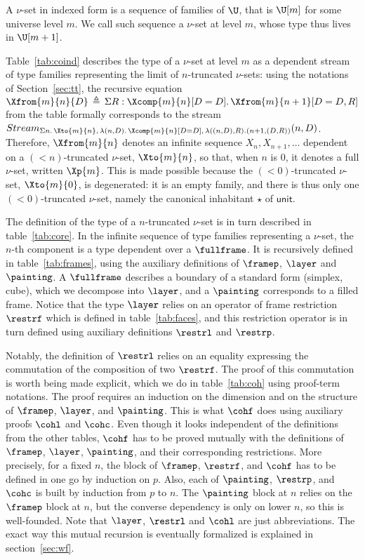 \documentclass{msc}
\newcommand{\unittype}{\ensuremath{\mathsf{unit}}}
\newcommand{\defeq}{\ensuremath{\triangleq}}
\renewcommand{\D}{D}
\newcommand{\pair}[2]{#1, #2}
\newcommand{\kstar}{{\star}}
\begin{document}
A $\nu$-set in indexed form is a sequence of families of $\U$, that is $\U[m]$ for some universe level $m$. We call such sequence a $\nu$-set at level $m$, whose type thus lives in $\U[m+1]$.

Table~\ref{tab:coind} describes the type of a $\nu$-set at level $m$ as a dependent stream of type families representing the limit of $n$-truncated $\nu$-sets: using the notations of Section~\ref{sec:tt}, the recursive equation $\Xfrom{m}{n}{D} \,\defeq\, \Sigma R: \Xcomp{m}{n}[D=\D].\, \Xfrom{m}{n+1}[D=\pair{D}{R}]$ from the table formally corresponds to the stream $Stream_{\Sigma n.\, \Xto{m}{n},\, \lambda (n, \D).\, \Xcomp{m}{n}[D=\D],\,\lambda ((n, D),R).(n+1,(\pair{D}{R}))}(n, \D)$. Therefore, $\Xfrom{m}{n}$ denotes an infinite sequence $X_{n}, X_{n+1}, \ldots$ dependent on a $(<n)$-truncated $\nu$-set, $\Xto{m}{n}$, so that, when $n$ is $0$, it denotes a full $\nu$-set, written $\Xp{m}$. This is made possible because the $(<0)$-truncated $\nu$-set, $\Xto{m}{0}$, is degenerated: it is an empty family, and there is thus only one $(<0)$-truncated $\nu$-set, namely the canonical inhabitant $\kstar$ of $\unittype$.

The definition of the type of a $n$-truncated $\nu$-set is in turn described in table~\ref{tab:core}. In the infinite sequence of type families representing a $\nu$-set, the $n$-th component is a type dependent over a $\fullframe$. It is recursively defined in table~\ref{tab:frames}, using the auxiliary definitions of $\framep$, $\layer$ and $\painting$. A $\fullframe$ describes a boundary of a standard form (simplex, cube), which we decompose into $\layer$, and a $\painting$ corresponds to a filled frame. Notice that the type $\layer$ relies on an operator of frame restriction $\restrf$ which is defined in table~\ref{tab:faces}, and this restriction operator is in turn defined using auxiliary definitions $\restrl$ and $\restrp$.

Notably, the definition of $\restrl$ relies on an equality expressing the commutation of the composition of two $\restrf$. The proof of this commutation is worth being made explicit, which we do in table~\ref{tab:coh} using proof-term notations. The proof requires an induction on the dimension and on the structure of $\framep$, $\layer$, and $\painting$. This is what $\cohf$ does using auxiliary proofs $\cohl$ and $\cohc$. Even though it looks independent of the definitions from the other tables, $\cohf$ has to be proved mutually with the definitions of $\framep$, $\layer$, $\painting$, and their corresponding restrictions. More precisely, for a fixed $n$, the block of $\framep$, $\restrf$, and $\cohf$ has to be defined in one go by induction on $p$. Also, each of $\painting$, $\restrp$, and $\cohc$ is built by induction from $p$ to $n$. The $\painting$ block at $n$ relies on the $\framep$ block at $n$, but the converse dependency is only on lower $n$, so this is well-founded. Note that $\layer$, $\restrl$ and $\cohl$ are just abbreviations. The exact way this mutual recursion is eventually formalized is explained in section~\ref{sec:wf}.
\end{document}
